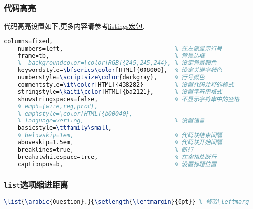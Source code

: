 \documentclass[list,answers,csize4,custom]{sysuexam}
\begin{document}
\subsubsection{代码高亮}
代码高亮设置如下,更多内容请参考\href{http://texdoc.net/texmf-dist/doc/latex/listings/listings.pdf}{listings宏包}.
\begin{lstlisting}[title=代码高亮设置,language=tex,firstnumber=224]
    columns=fixed,
    numbers=left,                                % 在左侧显示行号
    frame=tb,                                    % 背景边框
    %  backgroundcolor=\color[RGB]{245,245,244}, % 设定背景颜色
    keywordstyle=\bfseries\color[HTML]{008000},  % 设定关键字颜色
    numberstyle=\scriptsize\color{darkgray},     % 行号颜色
    commentstyle=\it\color[HTML]{438282},        % 设置代码注释的格式
    stringstyle=\kaiti\color[HTML]{ba2121},      % 设置字符串格式
    showstringspaces=false,                      % 不显示字符串中的空格
    % emph={wire,reg,prod},
    % emphstyle=\color[HTML]{b00040},
    % language=verilog,                          % 设置语言
    basicstyle=\ttfamily\small,
    % belowskip=1em,                             % 代码块结束间隔 
    aboveskip=1.5em,                             % 代码块开始间隔 
    breaklines=true,                             % 断行
    breakatwhitespace=true,                      % 在空格处断行
    captionpos=b,                                % 设置标题位置
\end{lstlisting}

\subsubsection{\texttt{list}选项缩进距离}
\begin{lstlisting}[title=设置整体缩进距离,language=tex,firstnumber=386]
    \list{\arabic{Question}.}{\setlength{\leftmargin}{0pt}} % 修改\leftmargin{<距离>}中的参数即可修改缩进距离
\end{lstlisting}
\end{document}
